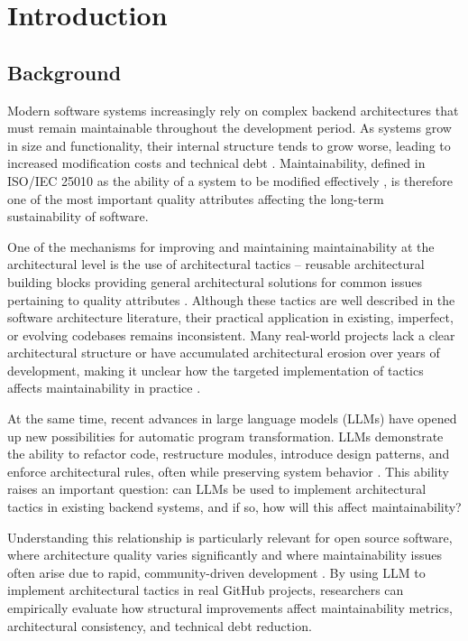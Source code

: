 \chapter{Introduction}
\label{chap:intro}
\section{Background}
\label{sec:section}

Modern software systems increasingly rely on complex backend architectures that must remain maintainable throughout the development period. As systems grow in size and functionality, their internal structure tends to grow worse, leading to increased modification costs and technical debt \cite{molnar2020study}. Maintainability, defined in ISO/IEC 25010 as the ability of a system to be modified effectively \cite{ISO25010}, is therefore one of the most important quality attributes affecting the long-term sustainability of software.

One of the mechanisms for improving and maintaining maintainability at the architectural level is the use of architectural tactics -- reusable architectural building blocks providing general architectural solutions for common issues pertaining to quality attributes \cite{kim2009qualitydriven}. Although these tactics are well described in the software architecture literature, their practical application in existing, imperfect, or evolving codebases remains inconsistent. Many real-world projects lack a clear architectural structure or have accumulated architectural erosion over years of development, making it unclear how the targeted implementation of tactics affects maintainability in practice \cite{kassab2018software, perry1992foundations}.

At the same time, recent advances in large language models (LLMs) have opened up new possibilities for automatic program transformation. LLMs demonstrate the ability to refactor code, restructure modules, introduce design patterns, and enforce architectural rules, often while preserving system behavior \cite{depalma2024exploring}. This ability raises an important question: can LLMs be used to implement architectural tactics in existing backend systems, and if so, how will this affect maintainability?

Understanding this relationship is particularly relevant for open source software, where architecture quality varies significantly and where maintainability issues often arise due to rapid, community-driven development \cite{kassab2018software}. By using LLM to implement architectural tactics in real GitHub projects, researchers can empirically evaluate how structural improvements affect maintainability metrics, architectural consistency, and technical debt reduction.

